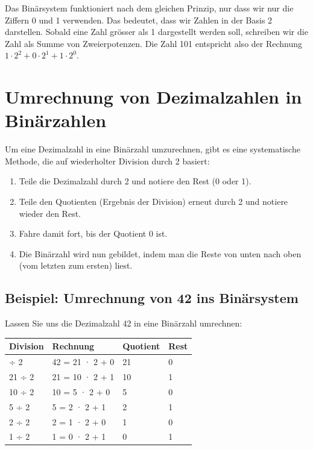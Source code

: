 \documentclass[
  nswissgerman,
  a4paper,
  DIV=11,
  numbers=noendperiod,
  ngerman]{scrreprt}
\newcounter{none} %
\providecommand{\tightlist}{%
  \setlength{\itemsep}{0pt}\setlength{\parskip}{0pt}}
\begin{document}
Das Binärsystem funktioniert nach dem gleichen Prinzip, nur dass wir nur
die Ziffern 0 und 1 verwenden. Das bedeutet, dass wir Zahlen in der
Basis 2 darstellen. Sobald eine Zahl grösser als 1 dargestellt werden
soll, schreiben wir die Zahl als Summe von Zweierpotenzen. Die Zahl 101
entspricht also der Rechnung
\(1 \cdot 2^2 + 0 \cdot 2^1 + 1 \cdot 2^0\).

\section{Umrechnung von Dezimalzahlen in
Binärzahlen}\label{umrechnung-von-dezimalzahlen-in-binuxe4rzahlen}

Um eine Dezimalzahl in eine Binärzahl umzurechnen, gibt es eine
systematische Methode, die auf wiederholter Division durch 2 basiert:

\begin{enumerate}
\def\labelenumi{\arabic{enumi}.}
\tightlist
\item
  Teile die Dezimalzahl durch 2 und notiere den Rest (0 oder 1).
\item
  Teile den Quotienten (Ergebnis der Division) erneut durch 2 und
  notiere wieder den Rest.
\item
  Fahre damit fort, bis der Quotient 0 ist.
\item
  Die Binärzahl wird nun gebildet, indem man die Reste von unten nach
  oben (vom letzten zum ersten) liest.
\end{enumerate}

\subsection{Beispiel: Umrechnung von 42 ins
Binärsystem}\label{beispiel-umrechnung-von-42-ins-binuxe4rsystem}

Lassen Sie uns die Dezimalzahl 42 in eine Binärzahl umrechnen:

{\def\LTcaptype{none} %
\begin{longtable}[]{@{}llll@{}}
\toprule\noalign{}
Division & Rechnung & Quotient & Rest \\
\midrule\noalign{}
\endhead
\bottomrule\noalign{}
\endlastfoot
42 ÷ 2 & 42 = 21 · 2 + 0 & 21 & 0 \\
21 ÷ 2 & 21 = 10 · 2 + 1 & 10 & 1 \\
10 ÷ 2 & 10 = 5 · 2 + 0 & 5 & 0 \\
5 ÷ 2 & 5 = 2 · 2 + 1 & 2 & 1 \\
2 ÷ 2 & 2 = 1 · 2 + 0 & 1 & 0 \\
1 ÷ 2 & 1 = 0 · 2 + 1 & 0 & 1 \\
\end{longtable}
}
\end{document}
